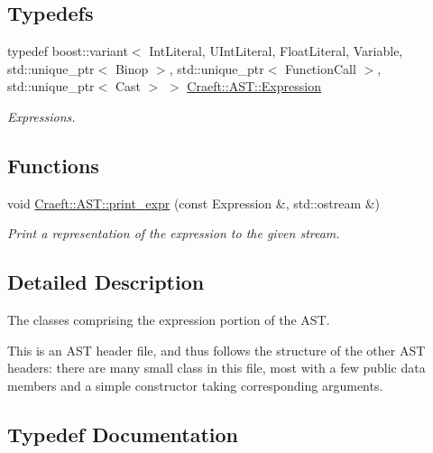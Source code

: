 \subsection*{Typedefs}
\begin{DoxyCompactItemize}
\item 
typedef boost\+::variant$<$ Int\+Literal, U\+Int\+Literal, Float\+Literal, Variable, std\+::unique\+\_\+ptr$<$ Binop $>$, std\+::unique\+\_\+ptr$<$ Function\+Call $>$, std\+::unique\+\_\+ptr$<$ Cast $>$ $>$ \hyperlink{_expression_8hh_aef28cabf6d8e7cb8324232e27e69606d}{Craeft\+::\+A\+S\+T\+::\+Expression}
\begin{DoxyCompactList}\small\item\em Expressions. \end{DoxyCompactList}\end{DoxyCompactItemize}
\subsection*{Functions}
\begin{DoxyCompactItemize}
\item 
void \hyperlink{_expression_8cpp_aa685c19f15521a85a802b0b0a7fd9ffb}{Craeft\+::\+A\+S\+T\+::print\+\_\+expr} (const Expression \&, std\+::ostream \&)
\begin{DoxyCompactList}\small\item\em Print a representation of the expression to the given stream. \end{DoxyCompactList}\end{DoxyCompactItemize}


\subsection{Detailed Description}
The classes comprising the expression portion of the A\+ST. 

This is an A\+ST header file, and thus follows the structure of the other A\+ST headers\+: there are many small class in this file, most with a few public data members and a simple constructor taking corresponding arguments. 

\subsection{Typedef Documentation}
\hypertarget{_expression_8hh_file_aef28cabf6d8e7cb8324232e27e69606d}{}\label{_expression_8hh_file_aef28cabf6d8e7cb8324232e27e69606d} 
